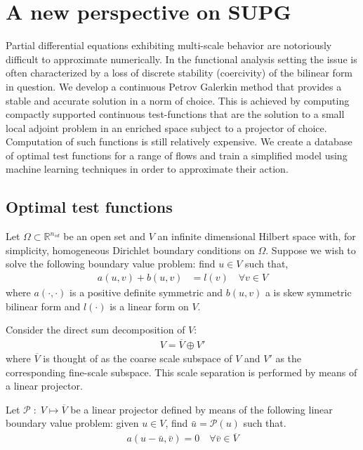 

\section{A new perspective on SUPG}
Partial differential equations exhibiting multi-scale behavior are notoriously difficult to approximate numerically. In the functional analysis setting the issue is often characterized by a loss of discrete stability (coercivity) of the bilinear form in question. We develop a continuous Petrov Galerkin method that provides a stable and accurate solution in a norm of choice.  This is achieved by computing compactly supported continuous test-functions that are the solution to a small local adjoint problem in an enriched space subject to a projector of choice. Computation of such functions is still relatively expensive. We create a database of optimal test functions for a range of flows and train a simplified model using  machine learning techniques in order to approximate their action.

\subsection{Optimal test functions}
Let $\Omega \subset \mathbb{R}^{n_{sd}}$ be an open set and $V$ an infinite dimensional Hilbert space with, for simplicity, homogeneous Dirichlet boundary conditions on $\Omega$. Suppose we wish to solve the following boundary value problem:  find $ u \in V$ such that,
\begin{align}
	a(u,v) + b(u,v) &= l(v) \quad \forall v \in V
	\label{eq:problem}
\end{align}
where $a(\cdot, \cdot)$ is a positive definite symmetric and $b(u,v)$ a is skew symmetric bilinear form and $l(\cdot )$ is a linear form on $V$.

Consider the direct sum decomposition of $V$:
\begin{align}
	V = \overline{V} \oplus V'
	\label{eq:decomp}
\end{align}
where $\overline{V}$ is thought of as the coarse scale subspace of $V$ and $V'$ as the corresponding fine-scale subspace. This scale separation is performed by means of a linear projector.
\begin{definition} Let  $\mathcal{P} \; : \; V \mapsto \overline{V}$ be a linear projector defined by means of the following linear boundary value problem: given $u \in V$, find $\bar{u} = \mathcal{P}(u)$ such that.
\begin{align}
	a(u- \bar{u}, \bar{v}) = 0 \quad \forall \bar{v} \in \overline{V}
	\label{eq:proj}
\end{align}
\end{definition}

